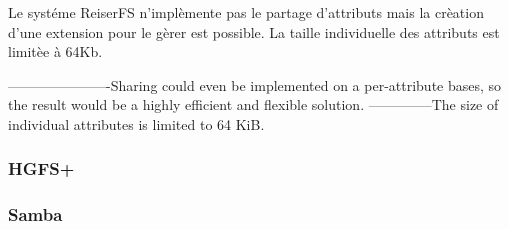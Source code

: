 Le systéme ReiserFS n'implèmente pas le partage d'attributs mais la crèation d'une extension pour le gèrer est possible. La taille individuelle des attributs est limitèe à 64Kb.

----------------------Sharing could even be implemented
on a per-attribute bases, so the result would be
a highly efficient and flexible solution. --------------The size of individual
attributes is limited to 64 KiB.

\subsubsection*{HGFS+}
\subsubsection*{Samba}
